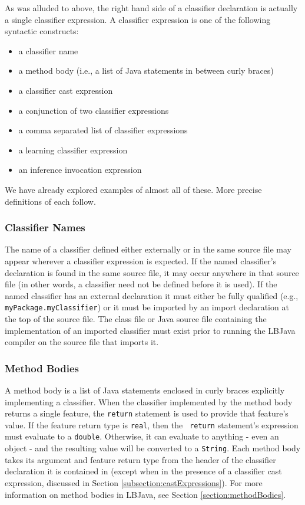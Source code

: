 As was alluded to above, the right hand side of a classifier declaration is
actually a single classifier expression.  A classifier expression is one of
the following syntactic constructs:

\begin{itemize}
\item a classifier name
\item a method body (i.e., a list of Java statements in between curly braces)
\item a classifier cast expression
\item a conjunction of two classifier expressions
\item a comma separated list of classifier expressions
\item a learning classifier expression
\item an inference invocation expression
\end{itemize}

\noindent
We have already explored examples of almost all of these.  More precise
definitions of each follow.

\subsubsection{Classifier Names} \label{subsection:classifierNames}
The name of a classifier defined either externally or in the same source file
may appear wherever a classifier expression is expected.  If the named
classifier's declaration is found in the same source file, it may occur
anywhere in that source file (in other words, a classifier need not be defined
before it is used).  If the named classifier has an external declaration it
must either be fully qualified (e.g., {\tt myPackage.myClassifier}) or it must
be imported by an import declaration at the top of the source file.  The class
file or Java source file containing the implementation of an imported
classifier must exist prior to running the LBJava compiler on the source file
that imports it.

\subsubsection{Method Bodies}
A method body is a list of Java statements enclosed in curly braces explicitly
implementing a classifier.  When the classifier implemented by the method body
returns a single feature, the {\tt return} statement is used to provide that
feature's value.  If the feature return type is {\tt real}, then the {\tt
return} statement's expression must evaluate to a {\tt double}.  Otherwise, it
can evaluate to anything - even an object - and the resulting value will be
converted to a {\tt String}.  Each method body takes its argument and feature
return type from the header of the classifier declaration it is contained in
(except when in the presence of a classifier cast expression, discussed in
Section \ref{subsection:castExpressions}).  For more information on method
bodies in LBJava, see Section \ref{section:methodBodies}.

